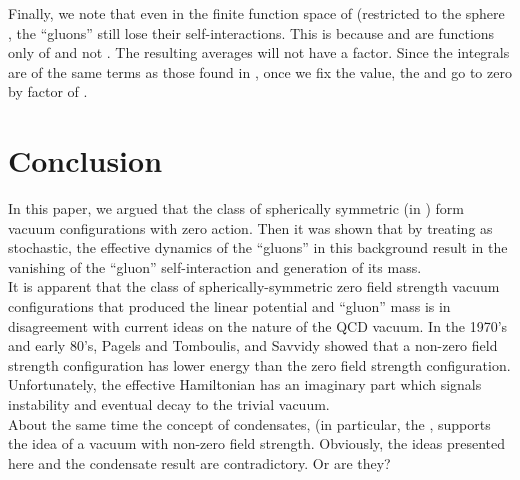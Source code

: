 \documentclass[a4paper,12pt]{article}
\begin{document}
Finally, we note that even in the finite function space of \coordHE{} (restricted to the sphere \coordHE{}, the ``gluons'' still lose their self-interactions.  This is because \coordHE{} and \coordHE{} are functions only of \coordHE{} and not \coordHE{}.  The resulting averages will not have a \coordHE{} factor.  Since the integrals are of the same terms as those found in \coordHE{}, once we fix the \coordHE{} value, the \coordHE{} and \coordHE{} go to zero by factor of \coordHE{}.

\section{Conclusion}

In this paper, we argued that the class of spherically symmetric \coordHE{} (in \coordHE{}) form vacuum configurations with zero action.  Then it was shown that by treating \coordHE{} as stochastic, the effective dynamics of the ``gluons'' in this background result in the vanishing of the ``gluon'' self-interaction and generation of its mass.\\

It is apparent that the class of spherically-symmetric zero field strength \coordHE{} vacuum configurations that produced the linear potential and ``gluon'' mass is in disagreement with current ideas on the nature of the QCD vacuum.  In the 1970's and early 80's, Pagels and Tomboulis\cite{Pagels}, and Savvidy\cite{Sav} showed that a non-zero field strength configuration has lower energy than the zero field strength configuration.  Unfortunately, the effective Hamiltonian has an imaginary part which signals instability and eventual decay to the trivial vacuum.\\

About the same time the concept of condensates\cite{Shifman}, (in particular, the \coordHE{}, supports the idea of a vacuum with non-zero field strength.  Obviously, the ideas presented here and the condensate result are contradictory.  Or are they?\\
\end{document}
